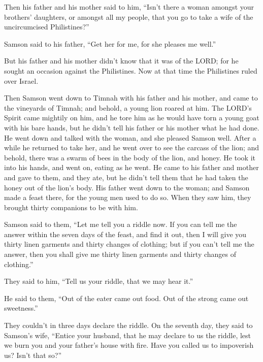  Then his father and his mother said to him, ``Isn't there
a woman amongst your brothers' daughters, or amongst all my people, that
you go to take a wife of the uncircumcised Philistines?''

Samson said to his father, ``Get her for me, for she pleases me well.''

 But his father and his mother didn't know that it was of
the LORD; for he sought an occasion against the Philistines. Now at that
time the Philistines ruled over Israel.

 Then Samson went down to Timnah with his father and his
mother, and came to the vineyards of Timnah; and behold, a young lion
roared at him.  The LORD's Spirit came mightily on him,
and he tore him as he would have torn a young goat with his bare hands,
but he didn't tell his father or his mother what he had done.
 He went down and talked with the woman, and she pleased
Samson well.  After a while he returned to take her, and
he went over to see the carcass of the lion; and behold, there was a
swarm of bees in the body of the lion, and honey.  He took
it into his hands, and went on, eating as he went. He came to his father
and mother and gave to them, and they ate, but he didn't tell them that
he had taken the honey out of the lion's body.  His
father went down to the woman; and Samson made a feast there, for the
young men used to do so.  When they saw him, they brought
thirty companions to be with him.

 Samson said to them, ``Let me tell you a riddle now. If
you can tell me the answer within the seven days of the feast, and find
it out, then I will give you thirty linen garments and thirty changes of
clothing;  but if you can't tell me the answer, then you
shall give me thirty linen garments and thirty changes of clothing.''

They said to him, ``Tell us your riddle, that we may hear it.''

 He said to them, ``Out of the eater came out food. Out
of the strong came out sweetness.''

They couldn't in three days declare the riddle.  On the
seventh day, they said to Samson's wife, ``Entice your husband, that he
may declare to us the riddle, lest we burn you and your father's house
with fire. Have you called us to impoverish us? Isn't that so?''

